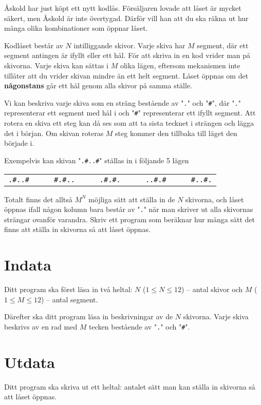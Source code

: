 Åskold har just köpt ett nytt kodlås.
Försäljaren lovade att låset är mycket säkert, men Åskold är inte övertygad.
Därför vill han att du ska räkna ut hur många olika kombinationer som öppnar låset.

Kodlåset består av $N$ intilliggande skivor.
Varje skiva har $M$ segment, där ett segment antingen är ifyllt eller ett hål.
För att skriva in en kod vrider man på skivorna.
Varje skiva kan sättas i $M$ olika lägen, eftersom mekanismen inte tillåter att du vrider skivan mindre än ett helt segment.
Låset öppnas om det \textbf{någonstans} går ett hål genom alla skivor på samma ställe.

Vi kan beskriva varje skiva som en sträng bestående av "\texttt{.}" och "\texttt{\#}",
där "\texttt{.}" representerar ett segment med hål i och "\texttt{\#}" representerar ett ifyllt segment.
Att rotera en skiva ett steg kan då ses som att ta sista tecknet i strängen och lägga det i början.
Om skivan roteras $M$ steg kommer den tillbaka till läget den började i.

Exempelvis kan skivan "\texttt{.\#..\#}" ställas in i följande 5 lägen

\begin{center}
  \begin{tabular}{l l|l l l|l l l|l l l|l l}
    \texttt{.\#..\#}&&& \texttt{\#.\#..}&&&\texttt{.\#.\#.}&&&\texttt{..\#.\#}&&&\texttt{\#..\#.}
  \end{tabular}
\end{center}

Totalt finns det alltså $M^N$ möjliga sätt att ställa in de $N$ skivorna, och låset öppnas ifall någon kolumn bara består av "\texttt{.}" 
när man skriver ut alla skivornas strängar ovanför varandra. Skriv ett program som beräknar hur många sätt det finns att ställa in skivorna så att låset öppnas.

\section*{Indata}
Ditt program ska först läsa in två heltal: $N$ ($1\le N \le 12$)  -- antal skivor och $M$ ($1\le M \le 12$) -- antal segment.

Därefter ska ditt program läsa in beskrivningar av de $N$ skivorna.
Varje skiva beskrivs av en rad med $M$ tecken bestående av "\texttt{.}" och "\texttt{\#}".

\section*{Utdata}
Ditt program ska skriva ut ett heltal: antalet sätt man kan ställa in skivorna så att låset öppnas.

